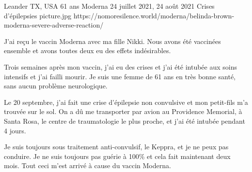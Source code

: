 {Leander TX, USA}
{61 ans}
{Moderna}
{24 juillet 2021, 24 août 2021}
{Crises d'épilepsies}
{picture.jpg}
{https://nomoresilence.world/moderna/belinda-brown-moderna-severe-adverse-reaction/}
{


J'ai reçu le vaccin Moderna avec ma fille Nikki. Nous avons été vaccinées
ensemble et avons toutes deux eu des effets indésirables.

Trois semaines après mon vaccin, j'ai eu des crises et j'ai été intubée aux
soins intensifs et j'ai failli mourir. Je suis une femme de 61 ans en très bonne
santé, sans aucun problème neurologique.

Le 20 septembre, j'ai fait une crise d'épilepsie non convulsive et mon
petit-fils m'a trouvée sur le sol. On a dû me transporter par avion au
Providence Memorial, à Santa Rosa, le centre de traumatologie le plus proche, et
j'ai été intubée pendant 4 jours.

Je suis toujours sous traitement anti-convulsif, le Keppra, et je ne peux pas
conduire. Je ne suis toujours pas guérie à 100\% et cela fait maintenant deux
mois. Tout ceci m'est arrivé à cause du vaccin Moderna.

}
